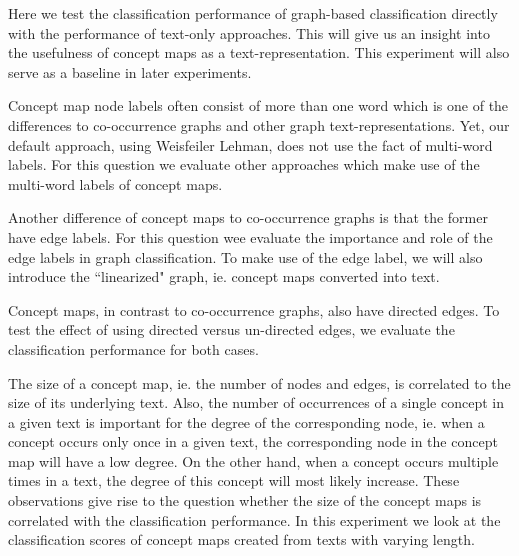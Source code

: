 Here we test the classification performance of graph-based classification directly with the performance of text-only approaches.
This will give us an insight into the usefulness of concept maps as a text-representation.
This experiment will also serve as a baseline in later experiments.

Concept map node labels often consist of more than one word which is one of the differences to co-occurrence graphs and other graph text-representations.
Yet, our default approach, using Weisfeiler Lehman, does not use the fact of multi-word labels.
For this question we evaluate other approaches which make use of the multi-word labels of concept maps.

Another difference of concept maps to co-occurrence graphs is that the former have edge labels.
For this question wee evaluate the importance and role of the edge labels in graph classification. To make use of the edge label, we will also introduce the ``linearized" graph, ie. concept maps converted into text.

Concept maps, in contrast to co-occurrence graphs, also have directed edges.
To test the effect of using directed versus un-directed edges, we evaluate the classification performance for both cases.

The size of a concept map, ie. the number of nodes and edges, is correlated to the size of its underlying text.
Also, the number of occurrences of a single concept in a given text is important for the degree of the corresponding node, ie. when a concept occurs only once in a given text, the corresponding node in the concept map will have a low degree.
On the other hand, when a concept occurs multiple times in a text, the degree of this concept will most likely increase.
These observations give rise to the question whether the size of the concept maps is correlated with the classification performance.
In this experiment we look at the classification scores of concept maps created from texts with varying length.

